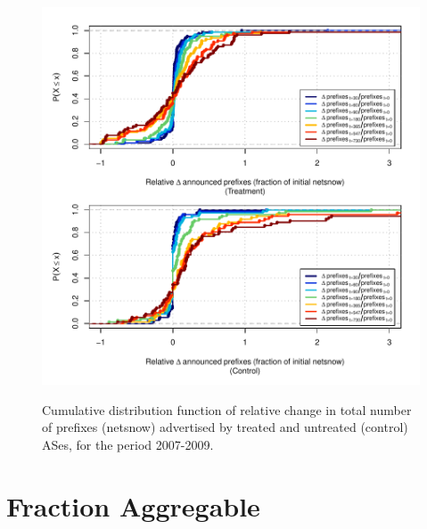 \clearpage
\vspace*{1.25em}
\begin{figure}[H]
\begin{centering}
\begin{singlespace}
\captionsetup{list=no}
    \includegraphics[width=6in]{figures/behavior-rel_netsnow-2007_2009-corr.pdf}
    \vspace{-2em}\\
    \caption{Cumulative distribution function of relative change in total
    number of prefixes (netsnow) advertised by treated and untreated (control)
    ASes, for the period 2007-2009.}
\end{singlespace}
\end{centering}
\end{figure}


\clearpage
\section{Fraction Aggregable}

